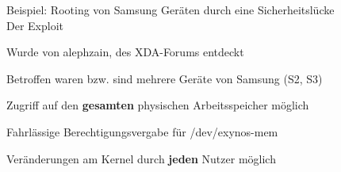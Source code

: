 \begin{frame}
	\centering
	Beispiel: Rooting von Samsung Geräten durch eine Sicherheitslücke\\
	\centering 
	Der Exploit

    		\begin{block}{}
    			Wurde von alephzain, des XDA-Forums entdeckt
    		\end{block}
    		\begin{block}{}
				Betroffen waren bzw. sind mehrere Geräte von Samsung (S2, S3)
			\end{block}
			\begin{block}{}
				Zugriff auf den \textbf{gesamten} physischen Arbeitsspeicher möglich
			\end{block}
			\begin{block}{}
				Fahrlässige Berechtigungsvergabe für /dev/exynos-mem
			\end{block}
			\begin{block}{}
				Veränderungen am Kernel durch \textbf{jeden} Nutzer möglich
			\end{block}

\end{frame}